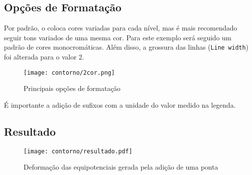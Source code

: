 \subsection{Opções de Formatação}

    Por padrão, o \software coloca cores variadas para cada nível, mas é mais recomendado seguir tons variados de uma mesma cor. Para este exemplo será seguido um padrão de cores monocromáticas. Além disso, a grossura das linhas (\texttt{Line width}) foi alterada para o valor 2.

    \begin{figure}[htbp]
        \centering
        \texttt{[image: contorno/2cor.png]}

        \caption{Principais opções de formatação}
        \label{fig:contorno:cor}
    \end{figure}

    \begin{lembrete}
        É importante a adição de sufixos com a unidade do valor medido na legenda.
    \end{lembrete}


\subsection{Resultado}

    \begin{figure}[htbp]
        \centering
        \texttt{[image: contorno/resultado.pdf]}

        \caption{Deformação das equipotenciais gerada pela adição de uma ponta}
        \label{fig:contorno:final}
    \end{figure}

